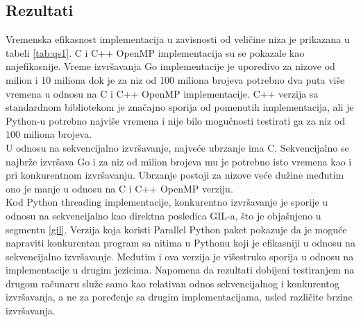 \documentclass[12pt,oneside]{memoir}
\begin{document}
\subsection{Rezultati}\label{qs:rez}

Vremenska efikasnost implementacija u zavisnosti od veličine niza je prikazana u tabeli \ref{tab:qs1}.  C i C++ OpenMP implementacija su se pokazale kao najefikasnije. Vreme izvršavanja Go implementacije je uporedivo za nizove od milion i 10 miliona dok je za niz od 100 miliona brojeva potrebno dva puta više vremena u odnosu na C i C++ OpenMP implementacije. C++ verzija sa standardnom bibliotekom je značajno sporija od pomenutih implementacija, ali je Python-u potrebno najviše vremena i nije bilo mogućnosti testirati ga za niz od 100 miliona brojeva.
\\

U odnosu na sekvencijalno izvršavanje, najveće ubrzanje ima C. Sekvencijalno se najbrže izvršava Go i za niz od milion brojeva mu je potrebno isto vremena kao i pri konkurentnom izvršavanju.  Ubrzanje postoji za nizove veće dužine međutim ono je manje u odnosu na C i C++ OpenMP verziju. 
\\

Kod Python threading implementacije, konkurentno izvršavanje je sporije u odnosu na sekvencijalno kao direktna posledica GIL-a, što je objašnjeno u segmentu \ref{gil}. Verzija koja koristi Parallel Python paket pokazuje da je moguće napraviti konkurentan program sa nitima u Pythonu koji je efikasniji u odnosu na sekvencijalno izvršavanje. Međutim i ova verzija je višestruko sporija u odnosu na implementacije u drugim jezicima. Napomena da rezultati dobijeni testiranjem na drugom računaru služe samo kao relativan odnos sekvencijalnog i konkurentog izvršavanja, a ne za poređenje sa drugim implementacijama, usled različite brzine izvršavanja.
\\
\end{document}
